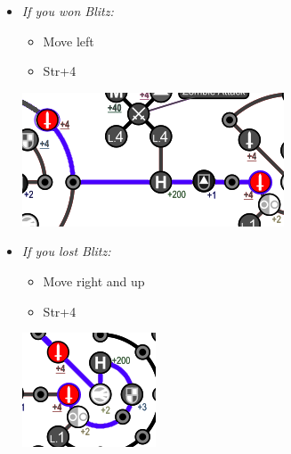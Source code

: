 \vfill
\begin{spheregrid}
\begin{itemize}
	\yunaf
	\item \textit{If you won Blitz:}
	\begin{itemize}
		\item Move left
		\item Str+4
	\end{itemize}
	\includegraphics[width=.75\columnwidth]{graphics/Yuna_blitz_win_highroad_before_natus}
	\item \textit{If you lost Blitz:}
	\begin{itemize}
		\item Move right and up
		\item Str+4
	\end{itemize}
	\includegraphics[width=.6\columnwidth]{graphics/Yuna_blitz_loss_highroad_before_natus}
\end{itemize}
\end{spheregrid}
		
